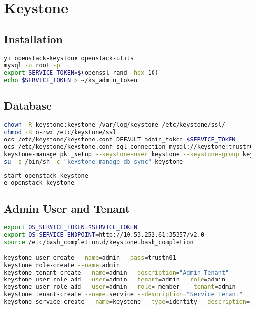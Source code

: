 \documentclass[11pt,letterpaper,oneside]{book}
\begin{document}
\chapter{Keystone}

\section{Installation}
\begin{lstlisting}[caption={foo},language=bash]
yi openstack-keystone openstack-utils 
mysql -u root -p
export SERVICE_TOKEN=$(openssl rand -hex 10)
echo $SERVICE_TOKEN > ~/ks_admin_token
\end{lstlisting}

\section{Database}

\begin{lstlisting}[caption={foo},language=bash]
chown -R keystone:keystone /var/log/keystone /etc/keystone/ssl/
chmod -R o-rwx /etc/keystone/ssl
ocs /etc/keystone/keystone.conf DEFAULT admin_token $SERVICE_TOKEN
ocs /etc/keystone/keystone.conf sql connection mysql://keystone:trustn01@10.53.252.61/keystone
keystone-manage pki_setup --keystone-user keystone --keystone-group keystone 
su -s /bin/sh -c "keystone-manage db_sync" keystone
\end{lstlisting}

\begin{lstlisting}[caption={Start and enable Keystone},language=bash]
start openstack-keystone
e openstack-keystone
\end{lstlisting}


\section{Admin User and Tenant}
\begin{lstlisting}[caption={Keystone ???},language=bash]
export OS_SERVICE_TOKEN=$SERVICE_TOKEN
export OS_SERVICE_ENDPOINT=http://10.53.252.61:35357/v2.0
source /etc/bash_completion.d/keystone.bash_completion 

keystone user-create --name=admin --pass=trustn01
keystone role-create --name=admin
keystone tenant-create --name=admin --description="Admin Tenant"
keystone user-role-add --user=admin --tenant=admin --role=admin
keystone user-role-add --user=admin --role=_member_ --tenant=admin
keystone tenant-create --name=service --description="Service Tenant"
keystone service-create --name=keystone --type=identity --description="OpenStack Identity" keystone endpoint-create --service=keystone --publicurl=http://10.53.252.61:5000/v2.0 --internalurl=http://10.53.252.61:5000/v2.0 --adminurl=http://10.53.252.61:35357/v2.0
\end{lstlisting}
\end{document}
